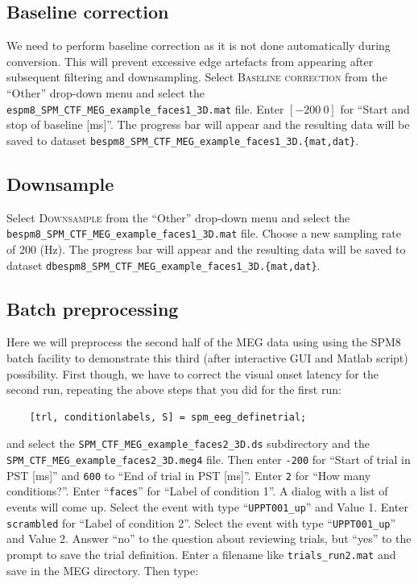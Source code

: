 \subsection{Baseline correction}

We need to perform baseline correction as it is not done automatically during conversion. This will prevent excessive edge artefacts from appearing after subsequent filtering and downsampling. Select \textsc{Baseline correction} from the ``Other'' drop-down menu and select the \texttt{espm8\_SPM\_CTF\_MEG\_example\_faces1\_3D.mat} file. Enter $[-200\: 0]$ for ``Start and stop of baseline [ms]''. The progress bar will appear and the resulting data will be saved to dataset \texttt{bespm8\_SPM\_\-CTF\_\-MEG\_\-example\_faces1\_3D.\{mat,dat\}}.

\subsection{Downsample}

Select \textsc{Downsample} from the ``Other'' drop-down menu and select the \texttt{bespm8\_SPM\_CTF\_\-MEG\_\-example\_\-faces1\_3D.mat} file. Choose a new sampling rate of 200 (Hz). The progress bar will appear and the resulting data will be saved to dataset \texttt{dbespm8\_SPM\_CTF\_MEG\_example\_faces1\_3D.\{mat,dat\}}.

\subsection{Batch preprocessing}

Here we will preprocess the second half of the MEG data using using the SPM8 batch facility to demonstrate this third (after interactive GUI and Matlab script) possibility. First though, we have to correct the visual onset latency for the second run, repeating the above steps that you did for the first run:

\begin{verbatim}
    [trl, conditionlabels, S] = spm_eeg_definetrial;
\end{verbatim}

and select the \texttt{SPM\_CTF\_MEG\_example\_faces2\_3D.ds} subdirectory and the \texttt{SPM\_\-CTF\_\-MEG\_\-example\_\-faces2\_3D.meg4} file. Then enter \texttt{-200} for ``Start of trial in PST [ms]'' and \texttt{600} to ``End of trial in PST [ms]''. Enter \texttt{2} for ``How many conditions?''. Enter ``\texttt{faces}'' for ``Label of condition 1''. A dialog with a list of events will come up. Select the event with type ``\texttt{UPPT001\_up}'' and Value 1. Enter \texttt{scrambled} for ``Label of condition 2''. Select the event with type ``\texttt{UPPT001\_up}'' and Value 2. Answer ``no'' to the question about reviewing trials, but ``yes'' to the prompt to save the trial definition. Enter a filename like \texttt{trials\_run2.mat} and save in the MEG directory. Then type:

